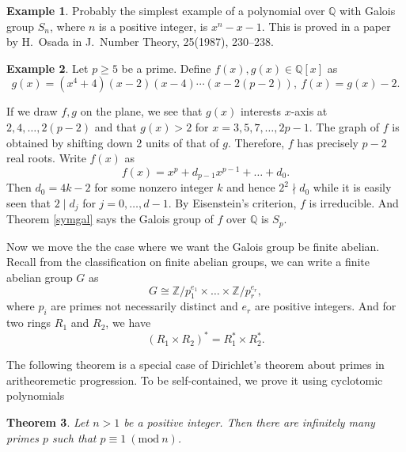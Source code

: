\documentclass[12pt]{report}
\newtheorem{theorem}{Theorem}[section]
\theoremstyle{definition}
\newtheorem{example}[theorem]{Example}
\newcommand{\Mod}[1]{\ (\mathrm{mod}\ #1)}
\newcommand{\zz}{\mathbb{Z}}
\newcommand{\qq}{\mathbb{Q}}
\begin{document}
\begin{example}
	Probably the simplest example of a polynomial over $\qq$ with Galois group $S_n$, where $n$ is a positive integer, is $x^n-x-1$. This is proved in a paper by H.~Osada in J.~Number Theory, 25(1987), 230–238.
\end{example}

\begin{example}\label{symexample}
	Let $p\geq 5$ be a prime. Define $f(x),g(x)\in \qq[x]$ as
	\[g(x)=(x^4+4)(x-2)(x-4)\cdots(x-2(p-2)),~f(x)=g(x)-2.\]

	If we draw $f,g$ on the plane, we see that $g(x)$ interests $x$-axis at $2,4,\dots,2(p-2)$ and that $g(x)>2$ for $x=3,5,7,\dots,2p-1$. The graph of $f$ is obtained by shifting down 2 units of that of $g$. Therefore, $f$ has precisely $p-2$ real roots. Write $f(x)$ as
	\[f(x)=x^p+d_{p-1}x^{p-1}+\dots+d_{0}.\]
	Then $d_{0}= 4k-2$ for some nonzero integer $k$ and hence $2^2\nmid d_{0}$ while it is easily seen that $2\mid d_{j}$ for $j=0,\dots,d-1$. By Eisenstein's criterion, $f$ is irreducible. And Theorem \ref{symgal} says the Galois group of $f$ over $\qq$ is $S_p$.
\end{example}


Now we move the the case where we want the Galois group be finite abelian. Recall from the classification on finite abelian groups, we can write a finite abelian group $G$ as \[G\cong \zz/p_1^{e_1}\times\dots\times \zz/p_r^{e_r},\] where $p_i$ are primes not necessarily distinct and $e_r$ are positive integers. And for two rings $R_1$ and $R_2$, we have \[(R_1\times R_2)^*=R_1^*\times R_2^*.\]

The following theorem is a special case of Dirichlet's theorem about primes in aritheoremetic progression. To be self-contained, we prove it using cyclotomic polynomials

\begin{theorem}
	Let $n>1$ be a positive integer. Then there are infinitely many primes $p$ such that $p\equiv 1\Mod{n}$.
\end{theorem}
\end{document}
